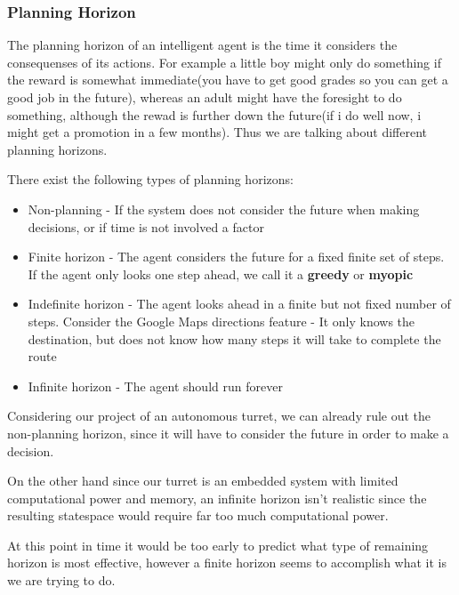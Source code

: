 \subsubsection{Planning Horizon}
The planning horizon of an intelligent agent is the time it considers the
consequenses of its actions. For example a little boy might only do something if
the reward is somewhat immediate(you have to get good grades so you can get a
good job in the future), whereas an adult might have the foresight to do
something, although the rewad is further down the future(if i do well now, i
might get a promotion in a few months). Thus we are talking about different
planning horizons.

There exist the following types of planning horizons:
\begin{itemize}
	\item Non-planning - If the system does not consider the future when making
	decisions, or if time is not involved a factor
	\item Finite horizon - The agent considers the future for a fixed finite set
	of steps. If the agent only looks one step ahead, we call it a \textbf{greedy}
	or \textbf{myopic} 
	\item Indefinite horizon - The agent looks ahead in a finite but not fixed
	number of steps. Consider the Google Maps directions feature - It only knows
	the destination, but does not know how many steps it will take to complete
	the route
	\item Infinite horizon - The agent should run forever	
\end{itemize}

Considering our project of an autonomous turret, we can already rule out the
non-planning horizon, since it will have to consider the future in order to
make a decision.

On the other hand since our turret is an embedded system with limited
computational power and memory, an infinite horizon isn’t realistic since the
resulting statespace would require far too much computational power.

At this point in time it would be too early to predict what type of
remaining horizon is most effective, however a finite horizon seems to
accomplish what it is we are trying to do.




